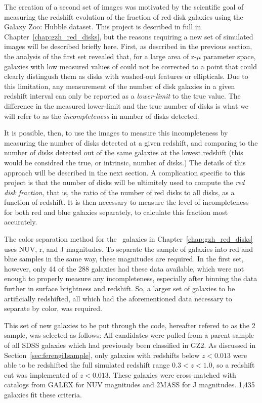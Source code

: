 The creation of a second set of \ferengi{} images was motivated by the scientific goal of measuring the redshift evolution of the fraction of red disk galaxies using the Galaxy Zoo: Hubble dataset. This project is described in full in Chapter~\ref{chap:gzh_red_disks}, but the reasons requiring a new set of simulated images will be described briefly here. First, as described in the previous section, the analysis of the first \ferengi{} set revealed that, for a large area of z-$\mu$ parameter space, galaxies with low measured values of \ffeatures{} could not be corrected to a point that could clearly distingush them as disks with washed-out features or ellipticals. Due to this limitation, any measurement of the number of disk galaxies in a given redshift interval can only be reported as a \emph{lower-limit} to the true value. The difference in the measured lower-limit and the true number of disks is what we will refer to as the \emph{incompleteness} in number of disks detected. 

It is possible, then, to use the \ferengi{} images to measure this incompleteness by measuring the number of disks detected at a given redshift, and comparing to the number of disks detected out of the same galaxies at the lowest redshift (this would be considred the true, or intrinsic, number of disks.) The details of this approach will be described in the next section. A complication specific to this project is that the number of disks will be ultimitely used to compute the \emph{red disk fraction}, that is, the ratio of the number of red disks to all disks, as a function of redshift. It is then necessary to measure the level of incompleteness for both red and blue galaxies separately, to calculate this fraction most accurately.

The color separation method for the \hst~galaxies in Chapter~\ref{chap:gzh_red_disks} uses NUV, r, and J magnitudes. To separate the \ferengi{} sample of galaxies into red and blue samples in the same way, these magnitudes are required. In the first set, however, only 44 of the 288 galaxies had these data available, which were not enough to properly measure any incompleteness, especially after binning the data further in surface brightness and redshift. So, a larger set of galaxies to be artificially redshifted, all which had the aforementioned data necessary to separate by color, was required.

This set of new galaxies to be put through the \ferengi{} code, hereafter refered to as the \ferengi{} 2 sample, was selected as follows: All candidates were pulled from a parent sample of all SDSS galaxies which had previously been classified in GZ2. As discussed in Section~\ref{sec:ferengi1sample}, only galaxies with redshifts below $z<0.013$ were able to be redshifted the full simulated redshift range $0.3<z<1.0$, so a redshift cut was implemented of $z<0.013$. These galaxies were cross-matched with catalogs from GALEX \citep{Martin2005} for NUV magnitudes and 2MASS \citep{Skrutskie2006} for J magnitudes. 1,435 galaxies fit these criteria.  

